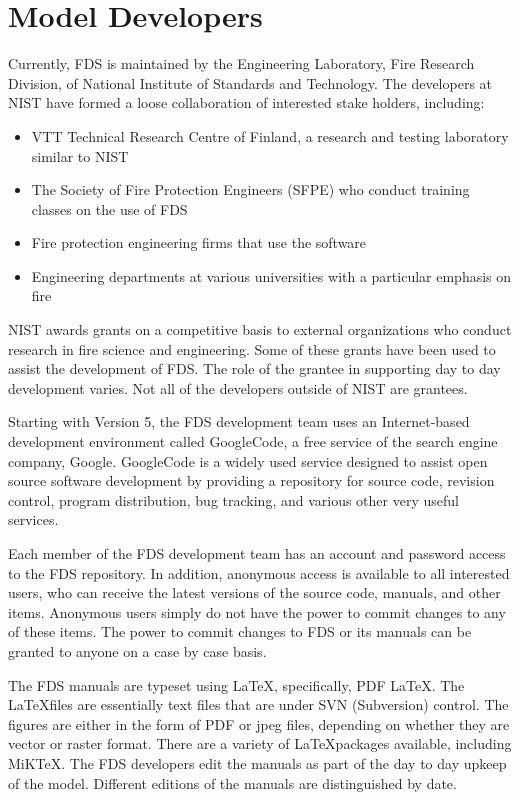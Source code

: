 \documentclass[11pt]{book}
\begin{document}
\section{Model Developers}


Currently, FDS is maintained by the Engineering Laboratory, Fire Research Division, of National Institute of Standards and Technology.
The developers at NIST have formed a loose collaboration of interested stake holders, including:
\begin{itemize}
\item VTT Technical Research Centre of Finland, a research and testing
laboratory similar to NIST
\item The Society of Fire Protection Engineers (SFPE) who conduct training classes on the use of FDS
\item Fire protection engineering firms that use the software
\item Engineering departments at various universities with a particular emphasis on fire
\end{itemize}
NIST awards grants on a competitive basis to external organizations who conduct research in fire science and engineering. Some of these grants have
been used to assist the development of FDS. The role of the grantee in supporting day to day development varies. Not all of the developers outside of
NIST are grantees.

Starting with Version 5, the FDS development team uses an Internet-based development environment called GoogleCode, a free service of the search
engine company, Google. GoogleCode is a widely used service designed to assist open source software development by providing a repository for source
code, revision control, program distribution, bug tracking, and various other very useful services.

Each member of the FDS development team has an account and password access to the FDS repository. In addition, anonymous access is available to all
interested users, who can receive the latest versions of the source code, manuals, and other items. Anonymous users simply do not have the power to
commit changes to any of these items. The power to commit changes to FDS or its manuals can be granted to anyone on a case by case basis.

The FDS manuals are typeset using \LaTeX, specifically, PDF \LaTeX. The \LaTeX files are essentially text files that are under SVN (Subversion)
control. The figures are either in the form of PDF or jpeg files, depending on whether they are vector or raster format. There are a variety of
\LaTeX packages available, including MiKTeX. The FDS developers edit the manuals as part of the day to day upkeep of the model. Different editions of
the manuals are distinguished by date.
\end{document}
